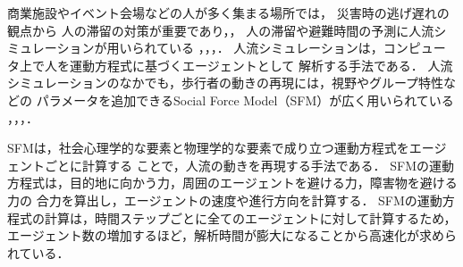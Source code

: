商業施設やイベント会場などの人が多く集まる場所では，
災害時の逃げ遅れの観点から
人の滞留の対策が重要であり\cite{taisaku1}，\cite{taisaku2}，
人の滞留や避難時間の予測に人流シミュレーションが用いられている
\cite{sim_jirei1}，\cite{sim_jirei2}，\cite{sim_jirei3}，\cite{sim_jirei8}．
人流シミュレーションは，コンピュータ上で人を運動方程式に基づくエージェントとして
解析する手法である．
人流シミュレーションのなかでも，歩行者の動きの再現には，視野やグループ特性などの
パラメータを追加できるSocial Force Model（SFM）が広く用いられている
\cite{helbing_sfm}，\cite{sfm_ntt}，\cite{sfm_para1}，\cite{intro_gunshu}．

SFMは，社会心理学的な要素と物理学的な要素で成り立つ運動方程式をエージェントごとに計算する
ことで，人流の動きを再現する手法である．
SFMの運動方程式は，目的地に向かう力，周囲のエージェントを避ける力，障害物を避ける力の
合力を算出し，エージェントの速度や進行方向を計算する．
SFMの運動方程式の計算は，時間ステップごとに全てのエージェントに対して計算するため，
エージェント数の増加するほど，解析時間が膨大になることから高速化が求められている．

